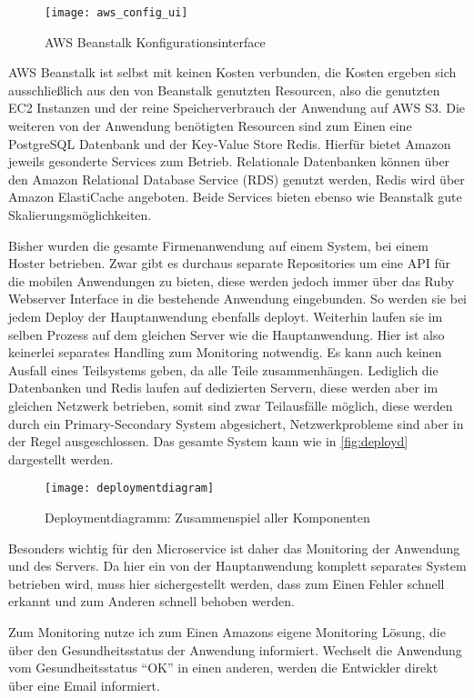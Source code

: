 \begin{figure}[!ht]
    \centering
    \caption{AWS Beanstalk Konfigurationsinterface}
    \label{fig:awsui}
    \texttt{[image: aws\_config\_ui]}
\end{figure}
AWS Beanstalk ist selbst mit keinen Kosten verbunden, die Kosten ergeben sich ausschließlich aus den von Beanstalk genutzten Resourcen, also die genutzten EC2 Instanzen und der reine Speicherverbrauch der Anwendung auf AWS S3. Die weiteren von der Anwendung benötigten Resourcen sind zum Einen eine PostgreSQL Datenbank und der Key-Value Store Redis. Hierfür bietet Amazon jeweils gesonderte Services zum Betrieb. Relationale Datenbanken können über den Amazon Relational Database Service (RDS) genutzt werden, Redis wird über Amazon ElastiCache angeboten. Beide Services bieten ebenso wie Beanstalk gute Skalierungsmöglichkeiten.

Bisher wurden die gesamte Firmenanwendung auf einem System, bei einem Hoster betrieben. Zwar gibt es durchaus separate Repositories um eine API für die mobilen Anwendungen zu bieten, diese werden jedoch immer über das Ruby Webserver Interface in die bestehende Anwendung eingebunden. So werden sie bei jedem Deploy der Hauptanwendung ebenfalls deployt. Weiterhin laufen sie im selben Prozess auf dem gleichen Server wie die Hauptanwendung. Hier ist also keinerlei separates Handling zum Monitoring notwendig. Es kann auch keinen Ausfall eines Teilsystems geben, da alle Teile zusammenhängen. Lediglich die Datenbanken und Redis laufen auf dedizierten Servern, diese werden aber im gleichen Netzwerk betrieben, somit sind zwar Teilausfälle möglich, diese werden durch ein Primary-Secondary System abgesichert, Netzwerkprobleme sind aber in der Regel ausgeschlossen. Das gesamte System kann wie in \autoref{fig:deployd} dargestellt werden.

\begin{figure}[!ht]
    \centering
    \caption{Deploymentdiagramm: Zusammenspiel aller Komponenten}
    \label{fig:deployd}
    \texttt{[image: deploymentdiagram]}
\end{figure}

Besonders wichtig für den Microservice ist daher das Monitoring der Anwendung und des Servers. Da hier ein von der Hauptanwendung komplett separates System betrieben wird, muss hier sichergestellt werden, dass zum Einen Fehler schnell erkannt und zum Anderen schnell behoben werden. 

Zum Monitoring nutze ich zum Einen Amazons eigene Monitoring Lösung, die über den Gesundheitsstatus der Anwendung informiert. Wechselt die Anwendung vom Gesundheitsstatus ``OK'' in einen anderen, werden die Entwickler direkt über eine Email informiert.

